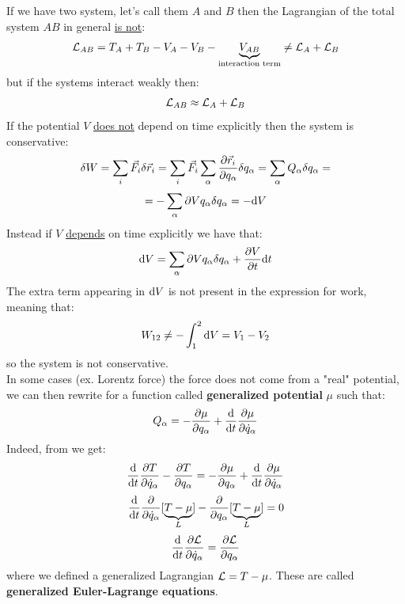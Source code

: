 If we have two system, let's call them $A$ and $B$ then the Lagrangian of the total system $AB$ in general \underline{is not}:
\begin{equation}
    \mathcal{L}_{AB} = T_A + T_B - V_A - V_B - \underbrace{V_{AB}}_{\text{interaction term}}\neq \mathcal{L}_A + \mathcal{L}_B
\end{equation}
but if the systems interact weakly then:
\begin{equation}
    \mathcal{L}_{AB} \approx \mathcal{L}_A + \mathcal{L}_B
\end{equation}
If the potential $V$ \underline{does not} depend on time explicitly then the system is conservative:
\begin{equation}
    \delta W = \displaystyle\sum_i \vec{F}_i \delta \vec{r}_i = \displaystyle\sum_i \vec{F}_i \displaystyle\sum_{\alpha}\dfrac{\partial \vec{r}_i}{\partial q_{\alpha}}\delta q_{\alpha} = \displaystyle\sum_{\alpha} Q_{\alpha}\delta q_{\alpha} =
\end{equation}
\begin{equation}
    = -\displaystyle\sum_{\alpha} \partial{V}{q_{\alpha}}\delta q_{\alpha} = -\mathrm{d}V
\end{equation}
Instead if $V$ \underline{depends} on time explicitly we have that:
\begin{equation}
    \mathrm{d}V = \displaystyle\sum_{\alpha} \partial{V}{q_{\alpha}}\delta q_{\alpha} + \dfrac{\partial V}{\partial t}\mathrm{d}t
\end{equation}
The extra term appearing in $\mathrm{d}V$ is not present in the expression for work, meaning that:
\begin{equation}
    W_{12} \neq -\int_{1}^{2}\mathrm{d}V = V_1 - V_2
\end{equation}
so the system is not conservative.\\
In some cases (ex. Lorentz force) the force does not come from a "real" potential, we can then rewrite \eleref\;for a function called \textbf{generalized potential} $\mu$ such that:
\begin{equation}
    Q_{\alpha} = -\dfrac{\partial \mu}{\partial q_{\alpha}} +\dfrac{\mathrm{d} }{\mathrm{d}t}\dfrac{\partial \mu}{\partial \dot{q}_{\alpha}}
\end{equation}
Indeed, from \lagrangeref\;we get:
\begin{equation}
    \dfrac{\mathrm{d} }{\mathrm{d}t}\dfrac{\partial T}{\partial \dot{q}_{\alpha}} - \dfrac{\partial T}{\partial q_{\alpha}} = -\dfrac{\partial \mu}{\partial q_{\alpha}} +\dfrac{\mathrm{d} }{\mathrm{d}t}\dfrac{\partial \mu}{\partial \dot{q}_{\alpha}}
\end{equation}
\begin{equation}
    \dfrac{\mathrm{d} }{\mathrm{d}t}\dfrac{\partial }{\partial \dot{q}_{\alpha}}[\underbrace{T-\mu}_L] - \dfrac{\partial}{\partial q_{\alpha}}[\underbrace{T-\mu}_L] = 0
\end{equation}
\begin{equation}
    \dfrac{\mathrm{d} }{\mathrm{d}t}\dfrac{\partial \mathcal{L}}{\partial \dot{q}_{\alpha}} = \dfrac{\partial \mathcal{L}}{\partial q_{\alpha}}
\end{equation}
where we defined a generalized Lagrangian $\mathcal{L} = T-\mu$. These are called \textbf{generalized Euler-Lagrange equations}.
